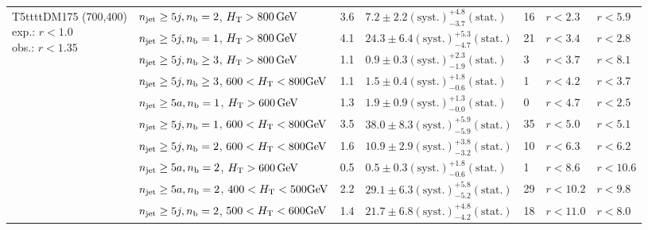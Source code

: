 \begin{table}[h!]
\begin{tabular}{ lllllll }
\multirow{10}{*}{\parbox[t]{2cm}{T5ttttDM175 (700,400)\\exp.: $r<1.0$\\obs.: $r<1.35$}}
 & $n_{\mathrm{jet}} \geq5j,n_{\text{b}} =2$, $\mbox{$H_\text{T}$} > 800 \, \mathrm{GeV}$ & 3.6 & $7.2 \pm 2.2 \mathrm{(syst.)} ^{+4.8}_{-3.7} \mathrm{(stat.)}$ & 16 & $r < 2.3$ & $r < 5.9$\\ 
 & $n_{\mathrm{jet}} \geq5j,n_{\text{b}} =1$, $\mbox{$H_\text{T}$} > 800 \, \mathrm{GeV}$ & 4.1 & $24.3 \pm 6.4 \mathrm{(syst.)} ^{+5.3}_{-4.7} \mathrm{(stat.)}$ & 21 & $r < 3.4$ & $r < 2.8$\\ 
 & $n_{\mathrm{jet}} \geq5j,n_{\text{b}} \geq3$, $\mbox{$H_\text{T}$} > 800 \, \mathrm{GeV}$ & 1.1 & $0.9 \pm 0.3 \mathrm{(syst.)} ^{+2.3}_{-1.9} \mathrm{(stat.)}$ & 3 & $r < 3.7$ & $r < 8.1$\\ 
 & $n_{\mathrm{jet}} \geq5j,n_{\text{b}} \geq3$, $600 < \mbox{$H_\text{T}$} < 800 \mathrm{GeV}$ & 1.1 & $1.5 \pm 0.4 \mathrm{(syst.)} ^{+1.8}_{-0.6} \mathrm{(stat.)}$ & 1 & $r < 4.2$ & $r < 3.7$\\ 
 & $n_{\mathrm{jet}} \geq5a,n_{\text{b}} =1$, $\mbox{$H_\text{T}$} > 600 \, \mathrm{GeV}$ & 1.3 & $1.9 \pm 0.9 \mathrm{(syst.)} ^{+1.3}_{-0.0} \mathrm{(stat.)}$ & 0 & $r < 4.7$ & $r < 2.5$\\ 
 & $n_{\mathrm{jet}} \geq5j,n_{\text{b}} =1$, $600 < \mbox{$H_\text{T}$} < 800 \mathrm{GeV}$ & 3.5 & $38.0 \pm 8.3 \mathrm{(syst.)} ^{+5.9}_{-5.9} \mathrm{(stat.)}$ & 35 & $r < 5.0$ & $r < 5.1$\\ 
 & $n_{\mathrm{jet}} \geq5j,n_{\text{b}} =2$, $600 < \mbox{$H_\text{T}$} < 800 \mathrm{GeV}$ & 1.6 & $10.9 \pm 2.9 \mathrm{(syst.)} ^{+3.8}_{-3.2} \mathrm{(stat.)}$ & 10 & $r < 6.3$ & $r < 6.2$\\ 
 & $n_{\mathrm{jet}} \geq5a,n_{\text{b}} =2$, $\mbox{$H_\text{T}$} > 600 \, \mathrm{GeV}$ & 0.5 & $0.5 \pm 0.3 \mathrm{(syst.)} ^{+1.8}_{-0.6} \mathrm{(stat.)}$ & 1 & $r < 8.6$ & $r < 10.6$\\ 
 & $n_{\mathrm{jet}} \geq5a,n_{\text{b}} =2$, $400 < \mbox{$H_\text{T}$} < 500 \mathrm{GeV}$ & 2.2 & $29.1 \pm 6.3 \mathrm{(syst.)} ^{+5.8}_{-5.2} \mathrm{(stat.)}$ & 29 & $r < 10.2$ & $r < 9.8$\\ 
 & $n_{\mathrm{jet}} \geq5j,n_{\text{b}} =2$, $500 < \mbox{$H_\text{T}$} < 600 \mathrm{GeV}$ & 1.4 & $21.7 \pm 6.8 \mathrm{(syst.)} ^{+4.8}_{-4.2} \mathrm{(stat.)}$ & 18 & $r < 11.0$ & $r < 8.0$\\ \hline
    \hline
  \end{tabular}
\end{table}

